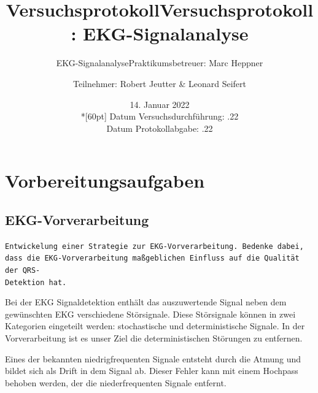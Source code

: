 \documentclass[a4paper,12pt,titlepage]{scrartcl}
\begin{document}
\titlehead
{
    \small
    {
        Technische Universität Ilmenau\\
        Fakulät IA\\
        Fachgebiet Biosignalverarbeitung\\

        Praktikum EKG-Signalanalyse\\
        WS 2021/22}
}

\title {Versuchsprotokoll}
\subtitle{EKG-Signalanalyse}
\author{}
\date{14. Januar 2022\\*[60pt]}

\title {Versuchsprotokoll: EKG-Signalanalyse}
\subtitle{Praktikumsbetreuer: Marc Heppner}
\author{Teilnehmer: Robert Jeutter \& Leonard Seifert}
\date{
    Datum Versuchsdurchführung: .22\\
    Datum Protokollabgabe: .22
}
\maketitle  %

\pagestyle{fancy}
\newpage

\section{Vorbereitungsaufgaben}
\subsection{EKG-Vorverarbeitung}
\texttt{Entwickelung einer Strategie zur EKG-Vorverarbeitung. Bedenke dabei, dass die EKG-Vorverarbeitung maßgeblichen Einfluss auf die Qualität der QRS-\\ Detektion hat.}

Bei der EKG Signaldetektion enthält das auszuwertende Signal neben dem gewünschten EKG verschiedene Störsignale. Diese Störsignale können in zwei Kategorien eingeteilt werden: stochastische und deterministische Signale. In der Vorverarbeitung ist es unser Ziel die deterministischen Störungen zu entfernen.

Eines der bekannten niedrigfrequenten Signale entsteht durch die Atmung und bildet sich als Drift in dem Signal ab. Dieser Fehler kann mit einem Hochpass behoben werden, der die niederfrequenten Signale entfernt.
\end{document}
